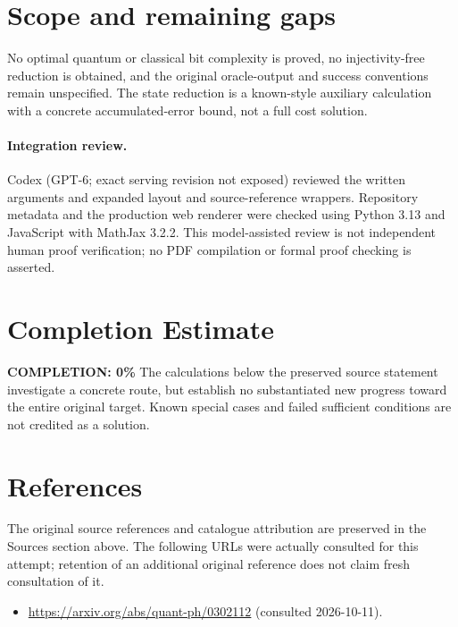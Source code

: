 \documentclass[11pt]{article}
\begin{document}
\section{Scope and remaining gaps}
No optimal quantum or classical bit complexity is proved, no injectivity-free reduction is obtained, and the original oracle-output and success conventions remain unspecified. The state reduction is a known-style auxiliary calculation with a concrete accumulated-error bound, not a full cost solution.
\paragraph{Integration review.} Codex (GPT-6; exact serving revision not exposed) reviewed the written arguments and expanded layout and source-reference wrappers. Repository metadata and the production web renderer were checked using Python 3.13 and JavaScript with MathJax 3.2.2. This model-assisted review is not independent human proof verification; no PDF compilation or formal proof checking is asserted.

\section{Completion Estimate}
\noindent\textbf{COMPLETION: 0\%}
The calculations below the preserved source statement investigate a concrete route,
but establish no substantiated new progress toward the entire original target.
Known special cases and failed sufficient conditions are not credited as a solution.
\section{References}
The original source references and catalogue attribution are preserved in the
Sources section above. The following URLs were actually consulted for this attempt;
retention of an additional original reference does not claim fresh consultation of it.
\begin{itemize}
\item \url{https://arxiv.org/abs/quant-ph/0302112} (consulted 2026-10-11). 
\end{itemize}
\end{document}
